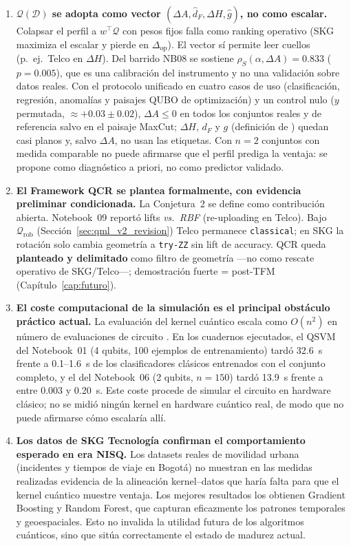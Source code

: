 \begin{enumerate}
\item \textbf{$\mathcal{Q}(\mathcal{D})$ se adopta como vector $(\Delta A,\hat{d}_F,\Delta H,\hat{g})$, no como escalar.} \label{conc:c1}
Colapsar el perfil a $w^\top\mathcal{Q}$ con pesos fijos falla como ranking operativo (SKG maximiza el escalar y pierde en $\Delta_{\mathrm{op}}$). El vector sí permite leer cuellos (p.~ej.\ Telco en $\Delta H$). Del barrido NB08 se sostiene $\rho_S(\alpha,\Delta A)=0.833$ ($p=0.005$), que es una calibración del instrumento y no una validación sobre datos reales. Con el protocolo unificado en cuatro casos de uso (clasificación, regresión, anomalías y paisajes QUBO de optimización) y un control nulo ($y$ permutada, $\approx+0.03\pm0.02$), $\Delta A\le0$ en todos los conjuntos reales y de referencia salvo en el paisaje MaxCut; $\Delta H$, $d_F$ y $g$ (definición de \citet{huang2021}) quedan casi planos y, salvo $\Delta A$, no usan las etiquetas. Con $n=2$ conjuntos con medida comparable no puede afirmarse que el perfil prediga la ventaja: se propone como diagnóstico a priori, no como predictor validado.

\item \textbf{El Framework QCR se plantea formalmente, con evidencia preliminar condicionada.} \label{conc:c2}
La Conjetura~2 se define como contribución abierta. Notebook~09 reportó lifts \emph{vs.\ RBF} (re-uploading en Telco). Bajo $\mathcal{Q}_{\mathrm{rob}}$ (Sección~\ref{sec:qml_v2_revision}) Telco permanece \texttt{classical}; en SKG la rotación solo cambia geometría a \texttt{try-ZZ} sin lift de accuracy. QCR queda \textbf{planteado y delimitado} como filtro de geometría ---no como rescate operativo de SKG/Telco---; demostración fuerte = post-TFM (Capítulo~\ref{cap:futuro}).

\item \textbf{El coste computacional de la simulación es el principal obstáculo práctico actual.}
La evaluación del kernel cuántico escala como $O(n^2)$ en número de evaluaciones de circuito \citep{haug2023}. En los cuadernos ejecutados, el QSVM del Notebook~01 (4 qubits, 100 ejemplos de entrenamiento) tardó 32.6~s frente a 0.1--1.6~s de los clasificadores clásicos entrenados con el conjunto completo, y el del Notebook~06 (2 qubits, $n=150$) tardó 13.9~s frente a entre 0.003 y 0.20~s. Este coste procede de simular el circuito en hardware clásico; no se midió ningún kernel en hardware cuántico real, de modo que no puede afirmarse cómo escalaría allí.

\item \textbf{Los datos de SKG Tecnología confirman el comportamiento esperado en era NISQ.}
Los datasets reales de movilidad urbana (incidentes y tiempos de viaje en Bogotá) no muestran en las medidas realizadas evidencia de la alineación kernel--datos que haría falta para que el kernel cuántico muestre ventaja. Los mejores resultados los obtienen Gradient Boosting y Random Forest, que capturan eficazmente los patrones temporales y geoespaciales. Esto no invalida la utilidad futura de los algoritmos cuánticos, sino que sitúa correctamente el estado de madurez actual.


\end{enumerate}
